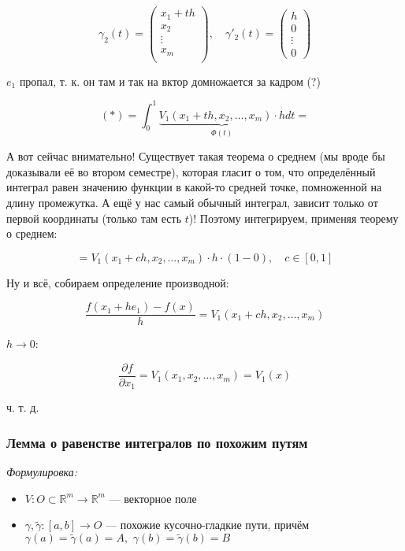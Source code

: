 \documentclass{article}
\def\dbl{\,\,}
\begin{document}
\[\gamma_2(t) = \begin{pmatrix}
    x_1 + th\\
    x_2\\
    \vdots \\
    x_m\\
\end{pmatrix}, \quad \gamma'_2(t) = \begin{pmatrix}
    h\\
    0\\
    \vdots\\
    0
\end{pmatrix}\]

$e_1$ пропал, т. к. он там и так на вктор домножается за кадром (?)

\[(*) = \int_{0}^{1} \underbrace{V_1(x_1 + th, x_2, \ldots, x_m) \cdot h}_{\Phi(t)}dt =\]

А вот сейчас внимательно! Существует такая теорема о среднем (мы вроде бы доказывали её во втором семестре), которая гласит о том, что определённый интеграл равен значению функции в какой-то средней точке, помноженной на длину промежутка. А ещё у нас самый обычный интеграл, зависит только от первой координаты (только там есть $t$)! Поэтому интегрируем, применяя теорему о среднем:

\[ = V_1(x_1 + ch, x_2, \ldots, x_m) \cdot h \cdot (1 - 0), \quad c \in [0, 1]\]

Ну и всё, собираем определение производной:

\[\frac{f(x_1 + he_1) - f(x)}{h} = V_1(x_1 + ch, x_2, \ldots, x_m)\]

$h \rightarrow 0$:

\[\frac{\partial f}{\partial x_1} = V_1(x_1, x_2, \ldots, x_m) = V_1(x)\]

ч. т. д. 

\subsubsection{Лемма о равенстве интегралов по похожим путям}
\textit{Формулировка:}

\begin{itemize}
    \item $V: O \subset \mathbb{R}^m \rightarrow \mathbb{R}^m$ --- векторное поле
    \item $\gamma, \tilde{\gamma}: [a, b] \rightarrow O$ --- похожие кусочно-гладкие пути, причём $\gamma(a) = \tilde{\gamma}(a) = A, \dbl \gamma(b) = \tilde{\gamma}(b) = B$
\end{itemize}
\end{document}
